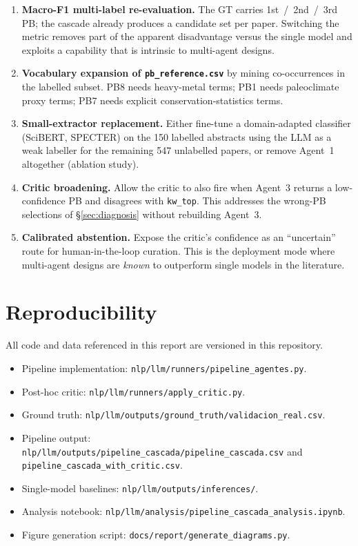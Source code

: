 \documentclass[11pt,a4paper]{article}
\begin{document}
\begin{enumerate}\itemsep1pt
\item \textbf{Macro-F1 multi-label re-evaluation.} The GT carries 1st~/~2nd~/~3rd PB; the cascade already produces a candidate set per paper. Switching the metric removes part of the apparent disadvantage versus the single model and exploits a capability that is intrinsic to multi-agent designs.
\item \textbf{Vocabulary expansion of \texttt{pb\_reference.csv}} by mining co-occurrences in the labelled subset. PB8 needs heavy-metal terms; PB1 needs paleoclimate proxy terms; PB7 needs explicit conservation-statistics terms.
\item \textbf{Small-extractor replacement.} Either fine-tune a domain-adapted classifier (SciBERT, SPECTER) on the 150 labelled abstracts using the LLM as a weak labeller for the remaining 547 unlabelled papers, or remove Agent~1 altogether (ablation study).
\item \textbf{Critic broadening.} Allow the critic to also fire when Agent~3 returns a low-confidence PB and disagrees with \texttt{kw\_top}. This addresses the wrong-PB selections of \S\ref{sec:diagnosis} without rebuilding Agent~3.
\item \textbf{Calibrated abstention.} Expose the critic's confidence as an \enquote{uncertain} route for human-in-the-loop curation. This is the deployment mode where multi-agent designs are \emph{known} to outperform single models in the literature.
\end{enumerate}

\section{Reproducibility}

All code and data referenced in this report are versioned in this repository.
\begin{itemize}\itemsep0pt
\item Pipeline implementation: \texttt{nlp/llm/runners/pipeline\_agentes.py}.
\item Post-hoc critic: \texttt{nlp/llm/runners/apply\_critic.py}.
\item Ground truth: \texttt{nlp/llm/outputs/ground\_truth/validacion\_real.csv}.
\item Pipeline output: \texttt{nlp/llm/outputs/pipeline\_cascada/pipeline\_cascada.csv} and\\\texttt{pipeline\_cascada\_with\_critic.csv}.
\item Single-model baselines: \texttt{nlp/llm/outputs/inferences/}.
\item Analysis notebook: \texttt{nlp/llm/analysis/pipeline\_cascada\_analysis.ipynb}.
\item Figure generation script: \texttt{docs/report/generate\_diagrams.py}.
\end{itemize}
\end{document}
